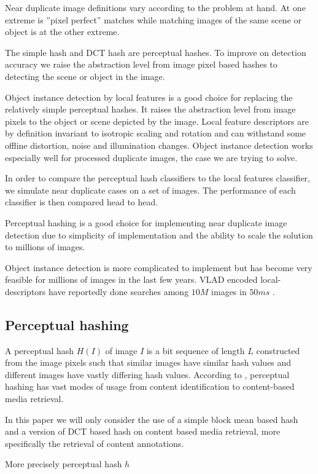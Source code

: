 \documentclass[english,12pt,a4paper,pdftex,elec,utf8]{aaltothesis}
\begin{document}
Near duplicate image definitions vary according to the problem at hand. At one extreme is ''pixel perfect'' matches while matching images of the same scene or object is at the other extreme.

The simple hash and DCT hash are perceptual hashes. To improve on detection accuracy we raise the abstraction level from image pixel based hashes to detecting the scene or object in the image.

Object instance detection by local features is a good choice for replacing the relatively simple perceptual hashes. It raises the abstraction level from image pixels to the object or scene depicted by the image. Local feature descriptors are by definition invariant to isotropic scaling and rotation and can withstand some offline distortion, noise and illumination changes. Object instance detection works especially well for processed duplicate images, the case we are trying to solve.

In order to compare the perceptual hash classifiers to the local features classifier, we simulate near duplicate cases on a set of images. The performance of each classifier is then compared head to head.

Perceptual hashing is a good choice for implementing near duplicate image detection due to simplicity of implementation and the ability to scale the solution to millions of images.

Object instance detection is more complicated to implement but has become very feasible for millions of images in the last few years. VLAD encoded local-descriptors have reportedly done searches among $10M$ images in $50ms$ \cite{Jegou2010}.

\subsection{Perceptual hashing} \label{perceptualhash}
A perceptual hash $H(I)$ of image $I$ is a bit sequence of length $L$ constructed from the image pixels such that similar images have similar hash values and different images have vastly differing hash values. According to \cite{Zauner2010}, perceptual hashing has vast modes of usage from content identification to content-based media retrieval.

In this paper we will only consider the use of a simple block mean based hash and a version of DCT based hash on content based media retrieval, more specifically the retrieval of content annotations.

More precisely perceptual hash $h$
\end{document}
